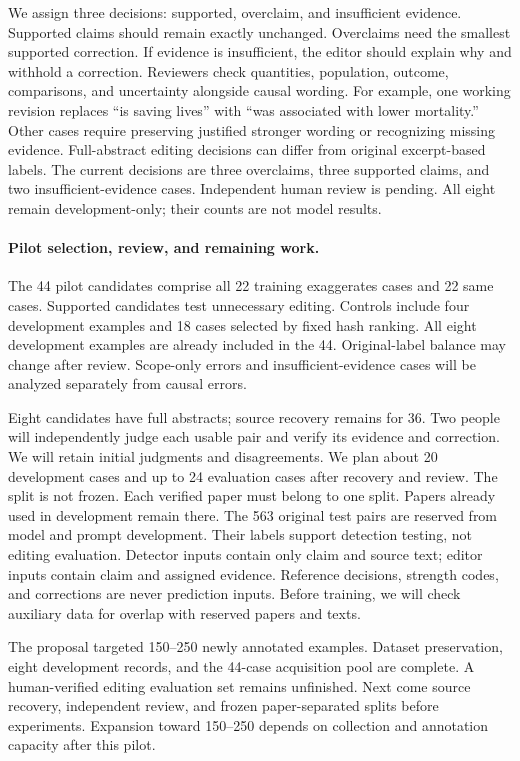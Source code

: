 We assign three decisions: supported, overclaim, and insufficient evidence.
Supported claims should remain exactly unchanged.
Overclaims need the smallest supported correction.
If evidence is insufficient, the editor should explain why and withhold a correction.
Reviewers check quantities, population, outcome, comparisons, and uncertainty alongside causal wording.
For example, one working revision replaces ``is saving lives'' with ``was associated with lower mortality.''
Other cases require preserving justified stronger wording or recognizing missing evidence.
Full-abstract editing decisions can differ from original excerpt-based labels.
The current decisions are three overclaims, three supported claims, and two insufficient-evidence cases.
Independent human review is pending.
All eight remain development-only; their counts are not model results.

\paragraph{Pilot selection, review, and remaining work.}
The 44 pilot candidates comprise all 22 training exaggerates cases and 22 same cases.
Supported candidates test unnecessary editing.
Controls include four development examples and 18 cases selected by fixed hash ranking.
All eight development examples are already included in the 44.
Original-label balance may change after review.
Scope-only errors and insufficient-evidence cases will be analyzed separately from causal errors.

Eight candidates have full abstracts; source recovery remains for 36.
Two people will independently judge each usable pair and verify its evidence and correction.
We will retain initial judgments and disagreements.
We plan about 20 development cases and up to 24 evaluation cases after recovery and review.
The split is not frozen.
Each verified paper must belong to one split.
Papers already used in development remain there.
The 563 original test pairs are reserved from model and prompt development.
Their labels support detection testing, not editing evaluation.
Detector inputs contain only claim and source text; editor inputs contain claim and assigned evidence.
Reference decisions, strength codes, and corrections are never prediction inputs.
Before training, we will check auxiliary data for overlap with reserved papers and texts.

The proposal targeted 150--250 newly annotated examples.
Dataset preservation, eight development records, and the 44-case acquisition pool are complete.
A human-verified editing evaluation set remains unfinished.
Next come source recovery, independent review, and frozen paper-separated splits before experiments.
Expansion toward 150--250 depends on collection and annotation capacity after this pilot.
